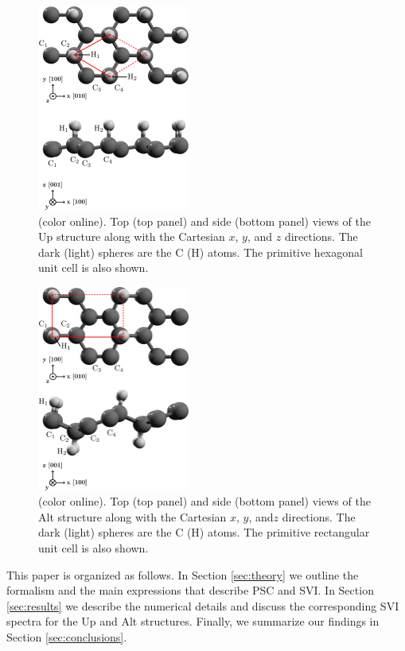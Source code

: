 \documentclass[floatfix,prb,aps,superscriptaddress,showpacs,11pt,preprint,letterpaper]{revtex4}
\begin{document}
\begin{figure}[ht!]
    \centering
    \includegraphics[width=5cm]{figures/fig1}
    \caption{(color online). Top (top panel) and side (bottom panel) views of
the Up structure along with the Cartesian $x$, $y$, and $z$ directions. The
dark (light) spheres are the C (H) atoms. The primitive hexagonal unit cell is
also shown.}
    \label{fig:up-struc}
\end{figure}
\begin{figure}[ht!]
    \centering
    \includegraphics[width=5cm]{figures/fig2}
    \caption{(color online). Top (top panel) and side (bottom panel) views of
the Alt structure along with the Cartesian $x$, $y$, and$ z$ directions. The
dark (light) spheres are the C (H) atoms. The primitive rectangular unit cell
is also shown. }
    \label{fig:alt-struc}
\end{figure}

This paper is organized as follows. In Section \ref{sec:theory} we outline the
formalism and the main expressions  that describe PSC and SVI. In Section
\ref{sec:results} we describe the numerical details  and  discuss the
corresponding SVI spectra for the Up and Alt structures. Finally, we summarize
our findings in Section \ref{sec:conclusions}.
\end{document}
